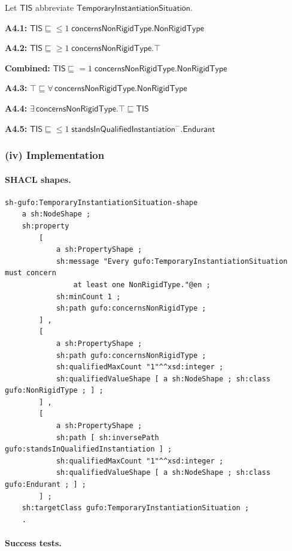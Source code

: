 \documentclass[12pt,a4paper]{article}
\begin{document}
Let $\mathsf{TIS}$ abbreviate $\mathsf{TemporaryInstantiationSituation}$.

\textbf{A4.1:}
$\mathsf{TIS} \sqsubseteq {\leq}1\;\mathsf{concernsNonRigidType}.\mathsf{NonRigidType}$

\textbf{A4.2:}
$\mathsf{TIS} \sqsubseteq {\geq}1\;\mathsf{concernsNonRigidType}.\top$

\textbf{Combined:}
$\mathsf{TIS} \sqsubseteq {=}1\;\mathsf{concernsNonRigidType}.\mathsf{NonRigidType}$

\textbf{A4.3:}
$\top \sqsubseteq \forall\,\mathsf{concernsNonRigidType}.\mathsf{NonRigidType}$

\textbf{A4.4:}
$\exists\,\mathsf{concernsNonRigidType}.\top \sqsubseteq \mathsf{TIS}$

\textbf{A4.5:}
$\mathsf{TIS} \sqsubseteq {\leq}1\;\mathsf{standsInQualifiedInstantiation}^{-}.\mathsf{Endurant}$

\subsubsection*{(iv) Implementation}

\paragraph{SHACL shapes.}

\begin{lstlisting}[style=turtlestyle]
sh-gufo:TemporaryInstantiationSituation-shape
    a sh:NodeShape ;
    sh:property
        [
            a sh:PropertyShape ;
            sh:message "Every gufo:TemporaryInstantiationSituation must concern
                at least one NonRigidType."@en ;
            sh:minCount 1 ;
            sh:path gufo:concernsNonRigidType ;
        ] ,
        [
            a sh:PropertyShape ;
            sh:path gufo:concernsNonRigidType ;
            sh:qualifiedMaxCount "1"^^xsd:integer ;
            sh:qualifiedValueShape [ a sh:NodeShape ; sh:class gufo:NonRigidType ; ] ;
        ] ,
        [
            a sh:PropertyShape ;
            sh:path [ sh:inversePath gufo:standsInQualifiedInstantiation ] ;
            sh:qualifiedMaxCount "1"^^xsd:integer ;
            sh:qualifiedValueShape [ a sh:NodeShape ; sh:class gufo:Endurant ; ] ;
        ] ;
    sh:targetClass gufo:TemporaryInstantiationSituation ;
    .
\end{lstlisting}

\paragraph{Success tests.}
\end{document}

